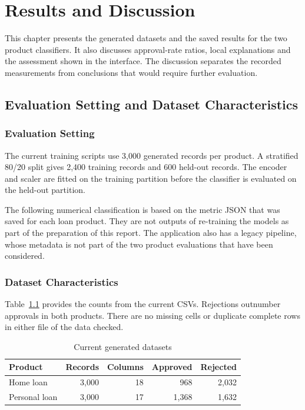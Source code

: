 \chapter[RESULTS AND DISCUSSION]{Results and Discussion}

This chapter presents the generated datasets and the saved results for the two product classifiers. It also discusses approval-rate ratios, local explanations and the assessment shown in the interface. The discussion separates the recorded measurements from conclusions that would require further evaluation.

\section{Evaluation Setting and Dataset Characteristics}
\subsection{Evaluation Setting}
The current training scripts use 3,000 generated records per product. A stratified 80/20 split gives 2,400 training records and 600 held-out records. The encoder and scaler are fitted on the training partition before the classifier is evaluated on the held-out partition.

The following numerical classification is based on the metric JSON that was saved for each loan product. They are not outputs of re-training the models as part of the preparation of this report. The application also has a legacy pipeline, whose metadata is not part of the two product evaluations that have been considered.

\subsection{Dataset Characteristics}
Table~\ref{tab:dataset-summary} provides the counts from the current CSVs. Rejections outnumber approvals in both products. There are no missing cells or duplicate complete rows in either file of the data checked.

\begin{table}[htbp]\centering\small
\caption{Current generated datasets}\label{tab:dataset-summary}
\begin{tabular}{lrrrr}\toprule
Product & Records & Columns & Approved & Rejected\\\midrule
Home loan & 3,000 & 18 & 968 & 2,032\\
Personal loan & 3,000 & 17 & 1,368 & 1,632\\\bottomrule
\end{tabular}\end{table}

